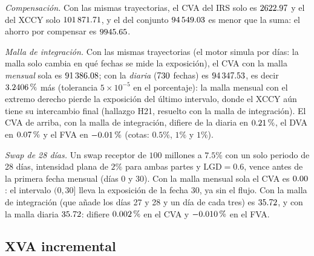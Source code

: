 \emph{Compensación.} Con las mismas trayectorias, el CVA del IRS solo es $\verif{cap14-sub-cva-irs}{2622.97}$ y el
del XCCY solo $\verif{cap14-sub-cva-xccy}{101871.71}$, y el del conjunto $\verif{cap14-sub-cva-union}{94549.03}$ es menor
que la suma: el ahorro por compensar es $\verif{cap14-sub-ahorro}{9945.65}$.

\emph{Malla de integración.} Con las mismas trayectorias (el motor simula por días: la malla solo cambia en qué fechas se
mide la exposición), el CVA con la malla \emph{mensual} sola es $\verif{cap14-malla-cva-mensual}{91386.08}$; con la
\emph{diaria} ($\verif{cap14-malla-puntos-diaria}{730}$ fechas) es $\verif{cap14-malla-cva-diaria}{94347.53}$, es decir
$\verif{cap14-malla-cambio}{3.2406}\,\%$ más (tolerancia $5\times10^{-5}$ en el porcentaje): la malla mensual con el extremo
derecho pierde la exposición del último intervalo, donde el XCCY aún tiene su intercambio final (hallazgo H21, resuelto con
la malla de integración). El CVA de arriba, con la malla de integración, difiere de la diaria en
$\verif{cap14-malla-integracion-cva}{0.21}\,\%$, el DVA en $\verif{cap14-malla-integracion-dva}{0.07}\,\%$ y el FVA en
$\verif{cap14-malla-integracion-fva}{-0.01}\,\%$ (cotas: $0.5\%$, $1\%$ y $1\%$).

\emph{Swap de 28 días.} Un swap receptor de $100$ millones a $7.5\%$ con un solo periodo de 28 días, intensidad plana de
$2\%$ para ambas partes y $\mathrm{LGD}=0.6$, vence antes de la primera fecha mensual (días 0 y 30). Con la malla mensual
sola el CVA es $\verif{cap14-corto-cva-mensual}{0.00}$: el intervalo $(0,30]$ lleva la exposición de la fecha 30, ya sin el flujo. Con la
malla de integración (que añade los días 27 y 28 y un día de cada tres) es $\verif{cap14-corto-cva-integracion}{35.72}$, y con la malla diaria
$\verif{cap14-corto-cva-diaria}{35.72}$: difiere $\verif{cap14-corto-cva-dif}{0.002}\,\%$ en el CVA y
$\verif{cap14-corto-fva-dif}{-0.010}\,\%$ en el FVA.

\subsection{XVA incremental}\label{sec:cap14-ej-incremental}

